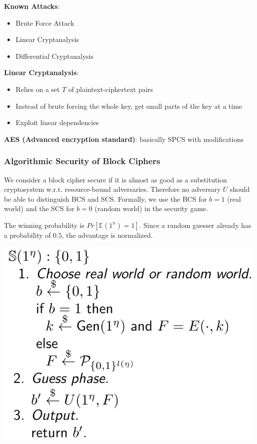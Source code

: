 \textbf{Known Attacks}:

\begin{itemize}
\tightlist
\item
  Brute Force Attack
\item
  Linear Cryptanalysis
\item
  Differential Cryptanalysis
\end{itemize}

\textbf{Linear Cryptanalysis}:

\begin{itemize}
\tightlist
\item
  Relies on a set \(T\) of plaintext-ciphertext pairs
\item
  Instead of brute forcing the whole key, get small parts of the key at
  a time
\item
  Exploit linear dependencies
\end{itemize}

\textbf{AES (Advanced encryption standard)}: basically SPCS with
modifications

\hypertarget{algorithmic-security-of-block-ciphers}{%
\subsubsection{Algorithmic Security of Block
Ciphers}\label{algorithmic-security-of-block-ciphers}}

\begin{minipage}{.55\linewidth}

We consider a block cipher secure if it is almost as good as a
substitution cryptosystem w.r.t. resource-bound adversaries. Therefore
no adversary \(U\) should be able to distinguish BCS and SCS. Formally,
we use the BCS for \(b=1\) (real world) and the SCS for \(b=0\) (random
world) in the security game.

The winning probability is \(Pr[\mathbb{E}(1^n) = 1]\). Since a random
guesser already has a probability of \(0.5\), the advantage is
normalized.

\end{minipage}\hfill
\begin{minipage}{.4\linewidth}

\includegraphics{img/BC_SG.png}

\end{minipage}

